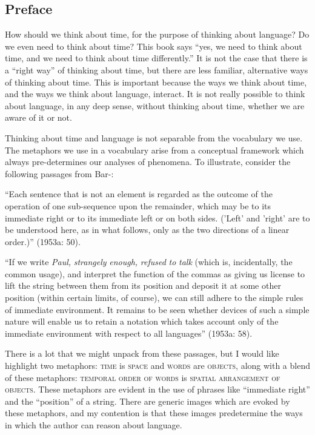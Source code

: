 
\subsection{Preface}

How should we think about time, for the purpose of thinking about language? Do we even need to think about time? This book says “yes, we need to think about time, and we need to think about time differently.” It is not the case that there is a “right way” of thinking about time, but there are less familiar, alternative ways of thinking about time. This is important because the ways we think about time, and the ways we think about language, interact. It is not really possible to think about language, in any deep sense, without thinking about time, whether we are aware of it or not. 

  Thinking about time and language is not separable from the vocabulary we use. The metaphors we use in a vocabulary arise from a conceptual framework which always pre-determines our analyses of phenomena. To illustrate, consider the following passages from Bar-\citet{Hillel1953a}:

“Each sentence that is not an element is regarded as the outcome of the operation of one sub-sequence upon the remainder, which may be to its immediate right or to its immediate left or on both sides. ('Left' and 'right' are to be understood here, as in what follows, only as the two directions of a linear order.)” (1953a: 50).

“If we write \textit{Paul,} \textit{strangely} \textit{enough,} \textit{refused} \textit{to} \textit{talk} (which is, incidentally, the common usage), and interpret the function of the commas as giving us license to lift the string between them from its position and deposit it at some other position (within certain limits, of course), we can still adhere to the simple rules of immediate environment. It remains to be seen whether devices of such a simple nature will enable us to retain a notation which takes account only of the immediate environment with respect to all languages” (1953a: 58).

There is a lot that we might unpack from these passages, but I would like highlight two metaphors: \textsc{time} is \textsc{space} and \textsc{words} are \textsc{objects}, along with a blend of these metaphors: \textsc{temporal} \textsc{order} \textsc{of} \textsc{words} is \textsc{spatial} \textsc{arrangement} \textsc{of} \textsc{objects}. These metaphors are evident in the use of phrases like “immediate right” and the “position” of a string. There are generic images which are evoked by these metaphors, and my contention is that these images predetermine the ways in which the author can reason about language. 

